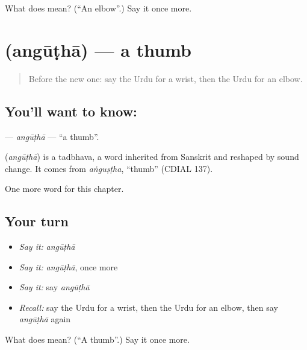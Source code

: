 \begin{tcolorbox}[breakable,colback=teal!4,colframe=teal!35!black,title={Before you move on}]
What does  mean? (\textquotedblleft{}An elbow\textquotedblright{}.) Say it once more.
\end{tcolorbox}
\section[\texorpdfstring{\ur{انگوٹھا} (angūṭhā)}{انگوٹھا (angūṭhā)}]{ (angūṭhā) — a thumb}

\label{lesson:UR-C130-angutha}



\begin{quote}
Before the new one: say the Urdu for a wrist, then the Urdu for an elbow.
\end{quote}

\subsection*{You'll want to know: }
\textbf{} — \emph{angūṭhā} — \textquotedblleft{}a thumb\textquotedblright{}.

\begin{cousinweb}
\textbf{} (\emph{angūṭhā}) is a tadbhava, a word inherited from Sanskrit and reshaped by sound change. It comes from \emph{aṅguṣṭha}, \textquotedblleft{}thumb\textquotedblright{} (CDIAL 137).
\end{cousinweb}

\begin{grammarlens}[title={What you've built}]
One more word for this chapter.
\end{grammarlens}

\subsection*{Your turn}
\begin{itemize}
\raggedright
  \item \emph{Say it:} \emph{angūṭhā}
  \item \emph{Say it:} \emph{angūṭhā}, once more
  \item \emph{Say it:} say \emph{angūṭhā}
  \item \emph{Recall:} say the Urdu for a wrist, then the Urdu for an elbow, then say \emph{angūṭhā} again
\end{itemize}

\begin{tcolorbox}[breakable,colback=teal!4,colframe=teal!35!black,title={Before you move on}]
What does  mean? (\textquotedblleft{}A thumb\textquotedblright{}.) Say it once more.
\end{tcolorbox}
